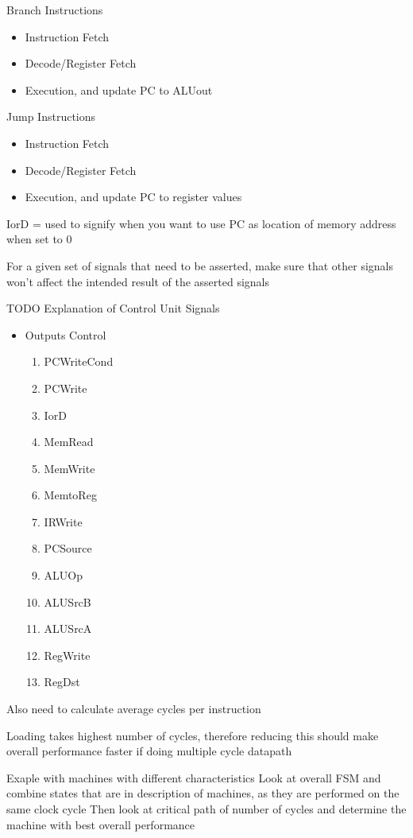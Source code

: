 \documentclass{article}
\begin{document}
		Branch Instructions
		\begin{itemize}
			\item Instruction Fetch
			\item Decode/Register Fetch
			\item Execution, and update PC to ALUout
		\end{itemize}

		Jump Instructions
		\begin{itemize}
			\item Instruction Fetch
			\item Decode/Register Fetch
			\item Execution, and update PC to register values
		\end{itemize}

		IorD = used to signify when you want to use PC as location of memory address when set to 0

		For a given set of signals that need to be asserted, make sure that other signals won't affect the intended result of the asserted signals

		TODO
		Explanation of Control Unit Signals
		\begin{itemize}
			\item Outputs Control
			\begin{enumerate}
				\item PCWriteCond
				\item PCWrite
				\item IorD
				\item MemRead
				\item MemWrite
				\item MemtoReg
				\item IRWrite
				\item PCSource
				\item ALUOp
				\item ALUSrcB
				\item ALUSrcA
				\item RegWrite
				\item RegDst
			\end{enumerate}
		\end{itemize}
		
	Also need to calculate average cycles per instruction

	Loading takes highest number of cycles, therefore reducing this should make overall performance faster if doing multiple cycle datapath

	Exaple with machines with different characteristics
		Look at overall FSM and combine states that are in description of machines, as they are performed on the same clock cycle
		Then look at critical path of number of cycles and determine the machine with best overall performance 
\end{document}
